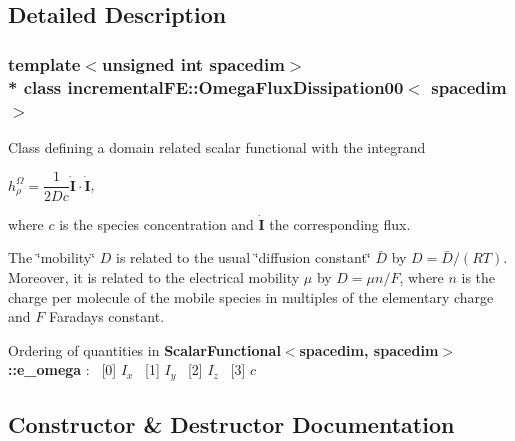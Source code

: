 \subsection{Detailed Description}
\subsubsection*{template$<$unsigned int spacedim$>$\\*
class incremental\+F\+E\+::\+Omega\+Flux\+Dissipation00$<$ spacedim $>$}

Class defining a domain related scalar functional with the integrand

$ h^\Omega_\rho = \dfrac{1}{2 D c} \dot{\boldsymbol{I}} \cdot \dot{\boldsymbol{I}} $,

where $c$ is the species concentration and $\dot{\boldsymbol{I}}$ the corresponding flux.

The \char`\"{}mobility\char`\"{} $D$ is related to the usual \char`\"{}diffusion constant\char`\"{} $ \bar D $ by $D = \bar D/(RT)$. Moreover, it is related to the electrical mobility $\mu$ by $ D = \mu n/F$, where $n$ is the charge per molecule of the mobile species in multiples of the elementary charge and $F$ Faraday\textquotesingle{}s constant.

Ordering of quantities in {\bf Scalar\+Functional$<$spacedim, spacedim$>$\+::e\+\_\+omega} \+:~\newline
\mbox{[}0\mbox{]} $I_x$~\newline
 \mbox{[}1\mbox{]} $I_y$~\newline
 \mbox{[}2\mbox{]} $I_z$~\newline
 \mbox{[}3\mbox{]} $c$ 

\subsection{Constructor \& Destructor Documentation}
